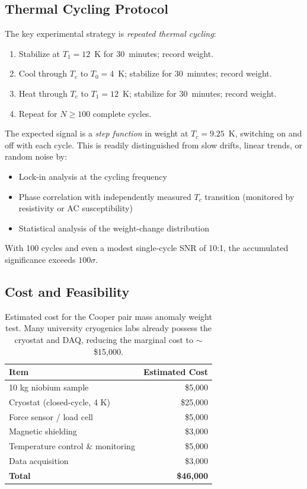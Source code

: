 \documentclass[12pt,a4paper]{article}
\theoremstyle{definition}
\theoremstyle{remark}
\begin{document}
\subsection{Thermal Cycling Protocol}

The key experimental strategy is \emph{repeated thermal cycling}:

\begin{enumerate}
\item Stabilize at $T_1 = 12$~K for 30~minutes; record weight.
\item Cool through $T_c$ to $T_0 = 4$~K; stabilize for 30~minutes; record weight.
\item Heat through $T_c$ to $T_1 = 12$~K; stabilize for 30~minutes; record weight.
\item Repeat for $N \geq 100$ complete cycles.
\end{enumerate}

The expected signal is a \emph{step function} in weight at $T_c = 9.25$~K,
switching on and off with each cycle.  This is readily distinguished from
slow drifts, linear trends, or random noise by:
\begin{itemize}
\item Lock-in analysis at the cycling frequency
\item Phase correlation with independently measured $T_c$ transition
(monitored by resistivity or AC susceptibility)
\item Statistical analysis of the weight-change distribution
\end{itemize}

With 100 cycles and even a modest single-cycle SNR of 10:1, the accumulated
significance exceeds $100\sigma$.

\subsection{Cost and Feasibility}

\begin{table}[h]
\centering
\renewcommand{\arraystretch}{1.3}
\begin{tabular}{lr}
\toprule
\textbf{Item} & \textbf{Estimated Cost} \\
\midrule
10 kg niobium sample & \$5,000 \\
Cryostat (closed-cycle, 4 K) & \$25,000 \\
Force sensor / load cell & \$5,000 \\
Magnetic shielding & \$3,000 \\
Temperature control \& monitoring & \$5,000 \\
Data acquisition & \$3,000 \\
\midrule
\textbf{Total} & \textbf{\$46,000} \\
\bottomrule
\end{tabular}
\caption{Estimated cost for the Cooper pair mass anomaly weight test.
Many university cryogenics labs already possess the cryostat and DAQ,
reducing the marginal cost to $\sim$\$15,000.}
\label{tab:cost}
\end{table}
\end{document}
